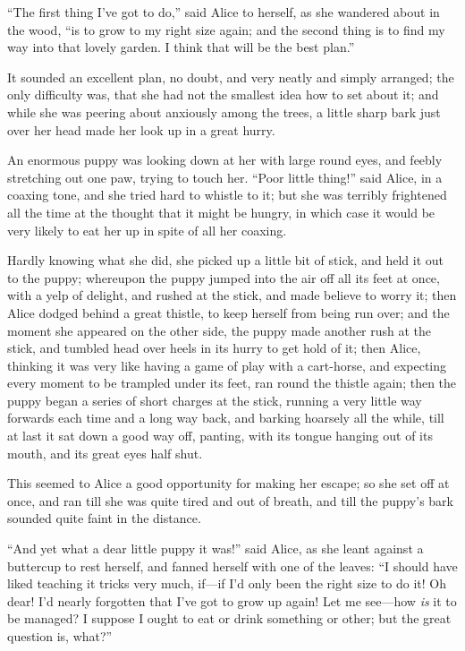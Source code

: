 \documentclass[book, 20pt]{extbook}
\begin{document}
``The first thing I've got to do,'' said Alice to herself, as she
wandered about in the wood, ``is to grow to my right size again; and the
second thing is to find my way into that lovely garden. I think that
will be the best plan.''

It sounded an excellent plan, no doubt, and very neatly and simply
arranged; the only difficulty was, that she had not the smallest idea
how to set about it; and while she was peering about anxiously among the
trees, a little sharp bark just over her head made her look up in a
great hurry.

An enormous puppy was looking down at her with large round eyes, and
feebly stretching out one paw, trying to touch her. ``Poor little
thing!'' said Alice, in a coaxing tone, and she tried hard to whistle to
it; but she was terribly frightened all the time at the thought that it
might be hungry, in which case it would be very likely to eat her up in
spite of all her coaxing.

Hardly knowing what she did, she picked up a little bit of stick, and
held it out to the puppy; whereupon the puppy jumped into the air off
all its feet at once, with a yelp of delight, and rushed at the stick,
and made believe to worry it; then Alice dodged behind a great thistle,
to keep herself from being run over; and the moment she appeared on the
other side, the puppy made another rush at the stick, and tumbled head
over heels in its hurry to get hold of it; then Alice, thinking it was
very like having a game of play with a cart-horse, and expecting every
moment to be trampled under its feet, ran round the thistle again; then
the puppy began a series of short charges at the stick, running a very
little way forwards each time and a long way back, and barking hoarsely
all the while, till at last it sat down a good way off, panting, with
its tongue hanging out of its mouth, and its great eyes half shut.

This seemed to Alice a good opportunity for making her escape; so she
set off at once, and ran till she was quite tired and out of breath, and
till the puppy's bark sounded quite faint in the distance.

``And yet what a dear little puppy it was!'' said Alice, as she leant
against a buttercup to rest herself, and fanned herself with one of the
leaves: ``I should have liked teaching it tricks very much, if---if I'd
only been the right size to do it! Oh dear! I'd nearly forgotten that
I've got to grow up again! Let me see---how \emph{is} it to be managed?
I suppose I ought to eat or drink something or other; but the great
question is, what?''
\end{document}
